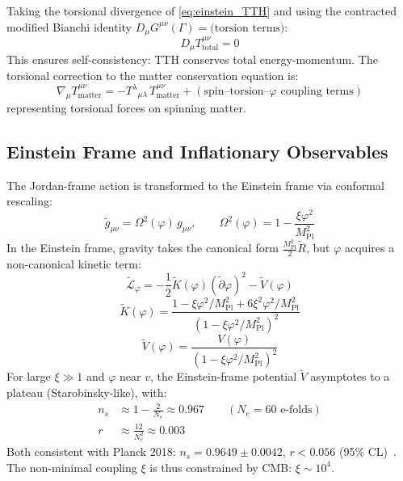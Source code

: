 \documentclass[12pt,a4paper]{article}
\newcommand{\MPl}{M_{\mathrm{Pl}}}
\numberwithin{equation}{section}
\begin{document}
Taking the torsional divergence of \eqref{eq:einstein_TTH} and using the contracted
modified Bianchi identity $D_\mu G^{\mu\nu}(\Gamma) = \text{(torsion terms)}$:
\begin{equation}
  D_\mu T^{\mu\nu}_{\mathrm{total}} = 0
  \label{eq:conservation}
\end{equation}
This ensures self-consistency: TTH conserves total energy-momentum.
The torsional correction to the matter conservation equation is:
\begin{equation}
  \nabla_\mu T^{\mu\nu}_{\mathrm{matter}}
  = -T^\lambda{}_{\mu\lambda}\,T^{\mu\nu}_{\mathrm{matter}}
  + (\text{spin--torsion--}\varphi\text{ coupling terms})
  \label{eq:matter_conservation}
\end{equation}
representing torsional forces on spinning matter.

\subsection{Einstein Frame and Inflationary Observables}
\label{sec:einstein_frame}

The Jordan-frame action is transformed to the Einstein frame via conformal rescaling:
\begin{equation}
  \tilde g_{\mu\nu} = \Omega^2(\varphi)\,g_{\mu\nu},
  \qquad
  \Omega^2(\varphi) = 1 - \frac{\xi\varphi^2}{\MPl^2}
  \label{eq:conformal}
\end{equation}
In the Einstein frame, gravity takes the canonical form $\tfrac{\MPl^2}{2}\tilde R$,
but $\varphi$ acquires a non-canonical kinetic term:
\begin{equation}
  \tilde{\mathcal{L}}_\varphi = -\frac{1}{2}\tilde K(\varphi)(\tilde\partial\varphi)^2 - \tilde V(\varphi)
  \label{eq:einstein_frame_lag}
\end{equation}
\begin{equation}
  \tilde K(\varphi) = \frac{1 - \xi\varphi^2/\MPl^2 + 6\xi^2\varphi^2/\MPl^2}{(1-\xi\varphi^2/\MPl^2)^2}
  \label{eq:K}
\end{equation}
\begin{equation}
  \tilde V(\varphi) = \frac{V(\varphi)}{(1-\xi\varphi^2/\MPl^2)^2}
  \label{eq:V_tilde}
\end{equation}
For large $\xi \gg 1$ and $\varphi$ near $v$, the Einstein-frame potential
$\tilde V$ asymptotes to a plateau (Starobinsky-like), with:
\begin{align}
  n_s &\approx 1 - \frac{2}{N_e} \approx 0.967 \qquad (N_e = 60\text{ e-folds})
  \label{eq:ns}\\
  r &\approx \frac{12}{N_e^2} \approx 0.003
  \label{eq:r}
\end{align}
Both consistent with Planck 2018: $n_s = 0.9649\pm0.0042$, $r < 0.056$ (95\% CL)~\citep{Planck2020}.
The non-minimal coupling $\xi$ is thus constrained by CMB: $\xi \sim 10^4$.
\end{document}
